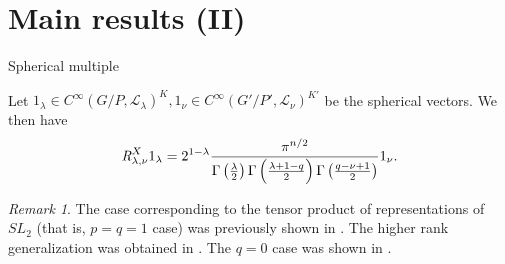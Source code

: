 \documentclass[pdf]{beamer}
\newcommand{\Res}{\operatorname{Res}\displaylimits}
\newcommand{\OpR}{\mbox{\it R}}
\theoremstyle{mystyle}
\theoremstyle{remark}
\newtheorem{remark}{Remark}
\begin{document}
\section{Main results (II)}
\begin{frame}{Spherical multiple}
	\begin{theorem}
		Let $1_\lambda\in C^\infty(G/P,\mathcal{L}_\lambda)^K,1_\nu\in C^\infty(G'/P',\mathcal{L}_\nu)^{K'}$ be the spherical vectors. We then have
	\[ \OpR^X_{\lambda, \nu} 1_{\lambda} = 2^{1 -
     \lambda} \frac{\pi^{n / 2}}{\Gamma \left( \frac{\lambda}{2} \right)
     \Gamma \left(  \frac{\lambda + 1-q}{2} \right) \Gamma \left(
     \frac{q - \nu + 1}{2} \right)} 1_{\nu}. \]
	\end{theorem}
	\begin{remark}
		The case corresponding to the tensor product of representations of $SL_2$ (that is, $p=q=1$ case)
		was previously shown in \cite[Lem. A.5]{bernstein2004estimates}.
		The higher rank generalization was obtained in \cite{clerc2011generalized}.
		The $q=0$ case was shown in \cite[Prop. 7.4]{kobayashi2015symmetry}.
	\end{remark}
\end{frame}
\end{document}
